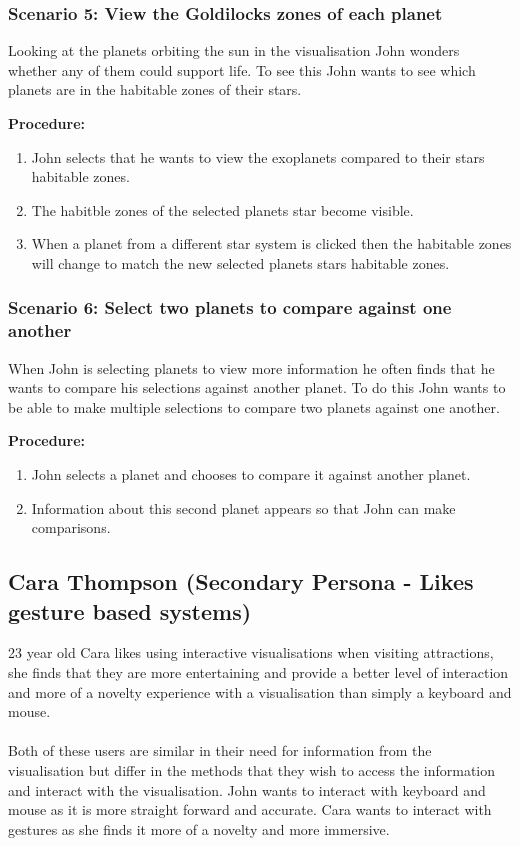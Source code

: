   
 \subsubsection{Scenario 5: View the Goldilocks zones of each planet}
   Looking at the planets orbiting the sun in the visualisation John wonders
whether any of them could support life. To see this John wants to see which
planets are in the habitable zones of their stars. 
 
  {\bf  Procedure:}
   \begin{enumerate}
 \item John selects that he wants to view the exoplanets compared to their stars
habitable zones.
 \item The habitble zones of the selected planets star become visible.
 \item When a planet from a different star system is clicked then the habitable
zones will change to match the new selected planets stars habitable zones.
 \end{enumerate}
 
  \subsubsection{Scenario 6: Select two planets to compare against one another}
When John is selecting planets to view more information he often finds that he
wants to compare his selections against another planet. To do this John wants to
be able to make multiple selections to compare two planets against one another.
  
  {\bf  Procedure:}
   \begin{enumerate}
 \item John selects a planet and chooses to compare it against another planet.
 \item Information about this second planet appears so that John can make
comparisons.
  \end{enumerate}

\subsection{Cara Thompson (Secondary Persona - Likes gesture based systems)}
23 year old Cara likes using interactive visualisations when visiting
attractions, she finds that they are more entertaining and provide a better
level of interaction and more of a novelty experience with a visualisation than
simply a keyboard and mouse. 
\\\\
Both of these users are similar in their need for information from the
visualisation but differ in the methods that they wish to access the information
and interact with the visualisation. John wants to interact with keyboard and
mouse as it is more straight forward and accurate. Cara wants to interact with
gestures as she finds it more of a novelty and more immersive.

